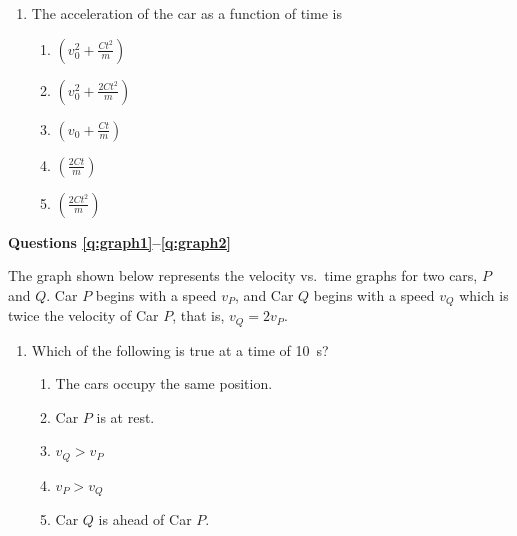 \documentclass{../../../oss-apphys}
\begin{document}
\begin{multicols}{2}
\begin{enumerate}[resume,leftmargin=18pt]
  \item The acceleration of the car as a function of time is
    \begin{enumerate}[noitemsep,topsep=0pt,leftmargin=18pt,label=(\Alph*)]
    \item $\displaystyle\left(v_0^2+\frac{Ct^2}{m}\right)$
    \item $\displaystyle\left(v_0^2+\frac{2Ct^2}{m}\right)$
    \item $\displaystyle\left(v_0+\frac{Ct}{m}\right)$
    \item $\displaystyle\left(\frac{2Ct}{m}\right)$
    \item $\displaystyle\left(\frac{2Ct^2}{m}\right)$
    \end{enumerate}
  \end{enumerate}
  \columnbreak
  
  \textbf{Questions \ref{q:graph1}--\ref{q:graph2}}

  The graph shown below represents the velocity vs.\ time graphs for two cars,
  $P$ and $Q$. Car $P$ begins with a speed $v_P$, and Car $Q$ begins with a
  speed $v_Q$ which is twice the velocity of Car $P$, that is, $v_Q=2v_P$.
  \begin{center}
  \end{center}
  \begin{enumerate}[resume,leftmargin=18pt]
  \item Which of the following is true at a time of \SI{10}{\second}?
    \begin{enumerate}[noitemsep,topsep=0pt,leftmargin=18pt,label=(\Alph*)]
    \item The cars occupy the same position.
    \item Car $P$ is at rest.
    \item $v_Q>v_P$
    \item $v_P>v_Q$
    \item Car $Q$ is ahead of Car $P$.
    \end{enumerate}
    \label{q:graph1}
    

\end{enumerate}
\end{multicols}
\end{document}
